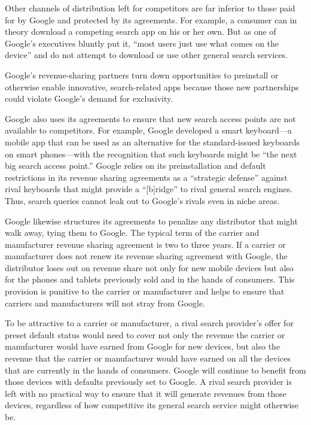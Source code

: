 \documentclass[11pt,b5paper,headings=small]{scrartcl}
\begin{document}
\begin{enumerate}

Other channels of distribution left for competitors are far inferior to those paid for
by Google and protected by its agreements. For example, a consumer can in theory download a
competing search app on his or her own. But as one of Google’s executives bluntly put it, “most
users just use what comes on the device” and do not attempt to download or use other general
search services.


Google’s revenue-sharing partners turn down opportunities to preinstall or
otherwise enable innovative, search-related apps because those new partnerships could violate
Google’s demand for exclusivity.


Google also uses its agreements to ensure that new search access points are not
available to competitors. For example, Google developed a smart keyboard—a mobile app that
can be used as an alternative for the standard-issued keyboards on smart phones—with the
recognition that such keyboards might be “the next big search access point.” Google relies on its
preinstallation and default restrictions in its revenue sharing agreements as a “strategic defense”
against rival keyboards that might provide a “[b]ridge” to rival general search engines. Thus,
search queries cannot leak out to Google’s rivals even in niche areas.


Google likewise structures its agreements to penalize any distributor that might
walk away, tying them to Google. The typical term of the carrier and manufacturer revenue
sharing agreement is two to three years. If a carrier or manufacturer does not renew its revenue
sharing agreement with Google, the distributor loses out on revenue share not only for new
mobile devices but also for the phones and tablets previously sold and in the hands of consumers.
This provision is punitive to the carrier or manufacturer and helps to ensure that carriers and
manufacturers will not stray from Google.


To be attractive to a carrier or manufacturer, a rival search provider’s offer for
preset default status would need to cover not only the revenue the carrier or manufacturer would
have earned from Google for new devices, but also the revenue that the carrier or manufacturer
would have earned on all the devices that are currently in the hands of consumers. Google will
continue to benefit from those devices with defaults previously set to Google. A rival search
provider is left with no practical way to ensure that it will generate revenues from those devices,
regardless of how competitive its general search service might otherwise be.


\end{enumerate}
\end{document}
